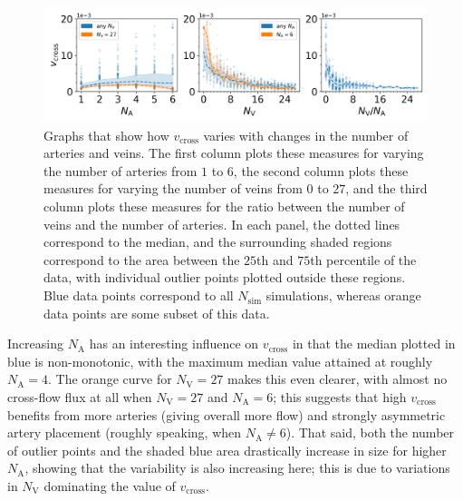             \begin{figure}
                \centering
                \includegraphics[width=\textwidth]{diagrams/results-variations/mega4_no-arteries_no-veins_veins-to-arteries.png}
                \caption{Graphs that show how $v_\text{cross}$ varies with changes in the number of arteries and veins. The first column plots these measures for varying the number of arteries from $1$ to $6$, the second column plots these measures for varying the number of veins from $0$ to $27$, and the third column plots these measures for the ratio between the number of veins and the number of arteries. In each panel, the dotted lines correspond to the median, and the surrounding shaded regions correspond to the area between the $25$th and $75$th percentile of the data, with individual outlier points plotted outside these regions. Blue data points correspond to all $N_\text{sim}$ simulations, whereas orange data points are some subset of this data.}
                \label{fig:mega-vessels4}
            \end{figure}
            
            Increasing $N_\text{A}$ has an interesting influence on $v_\text{cross}$ in that the median plotted in blue is non-monotonic, with the maximum median value attained at roughly $N_\text{A} = 4$. The orange curve for $N_\text{V} = 27$ makes this even clearer, with almost no cross-flow flux at all when $N_\text{V} = 27$ and $N_\text{A} = 6$; this suggests that high $v_\text{cross}$ benefits from more arteries (giving overall more flow) and strongly asymmetric artery placement (roughly speaking, when $N_\text{A} \neq 6$). That said, both the number of outlier points and the shaded blue area drastically increase in size for higher $N_\text{A}$, showing that the variability is also increasing here; this is due to variations in $N_\text{V}$ dominating the value of $v_\text{cross}$.
            
